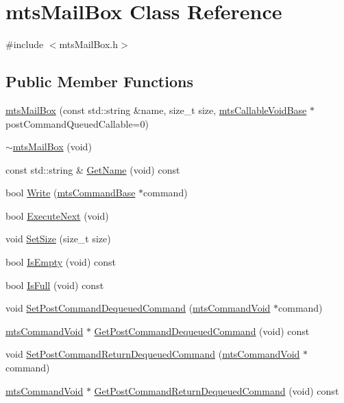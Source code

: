 \hypertarget{classmts_mail_box}{}\section{mts\+Mail\+Box Class Reference}
\label{classmts_mail_box}


{\ttfamily \#include $<$mts\+Mail\+Box.\+h$>$}

\subsection*{Public Member Functions}
\begin{DoxyCompactItemize}
\item 
\hyperlink{classmts_mail_box_a06a0abec903ca41c875d0bcdb8c53ebc}{mts\+Mail\+Box} (const std\+::string \&name, size\+\_\+t size, \hyperlink{classmts_callable_void_base}{mts\+Callable\+Void\+Base} $\ast$post\+Command\+Queued\+Callable=0)
\item 
\hyperlink{classmts_mail_box_ab20b400d82db33fd56a285771ac03ec2}{$\sim$mts\+Mail\+Box} (void)
\item 
const std\+::string \& \hyperlink{classmts_mail_box_aadf082bf9196ca93576599fd23cab55c}{Get\+Name} (void) const 
\item 
bool \hyperlink{classmts_mail_box_abcaf2f8760c31ced98abbbff0f9374e4}{Write} (\hyperlink{classmts_command_base}{mts\+Command\+Base} $\ast$command)
\item 
bool \hyperlink{classmts_mail_box_ab6a23137faacef309d53a0b3ffc985a8}{Execute\+Next} (void)
\item 
void \hyperlink{classmts_mail_box_a1224e07589e01a5a1c80f3dcc5f3c14a}{Set\+Size} (size\+\_\+t size)
\item 
bool \hyperlink{classmts_mail_box_aabf221528804d0ff287eb3b1ffe78b20}{Is\+Empty} (void) const 
\item 
bool \hyperlink{classmts_mail_box_ab5c7ee34e956c7c79288018a353b1ce6}{Is\+Full} (void) const 
\item 
void \hyperlink{classmts_mail_box_a12272c44ebcb68cfcfaf59f18cda21d3}{Set\+Post\+Command\+Dequeued\+Command} (\hyperlink{classmts_command_void}{mts\+Command\+Void} $\ast$command)
\item 
\hyperlink{classmts_command_void}{mts\+Command\+Void} $\ast$ \hyperlink{classmts_mail_box_af703607d2b078aadcfb079027b2221cf}{Get\+Post\+Command\+Dequeued\+Command} (void) const 
\item 
void \hyperlink{classmts_mail_box_a8a2d79ee98f9d4d87d595bc070a2b465}{Set\+Post\+Command\+Return\+Dequeued\+Command} (\hyperlink{classmts_command_void}{mts\+Command\+Void} $\ast$command)
\item 
\hyperlink{classmts_command_void}{mts\+Command\+Void} $\ast$ \hyperlink{classmts_mail_box_a6951651caf769035f266ba409f369579}{Get\+Post\+Command\+Return\+Dequeued\+Command} (void) const 
\end{DoxyCompactItemize}


